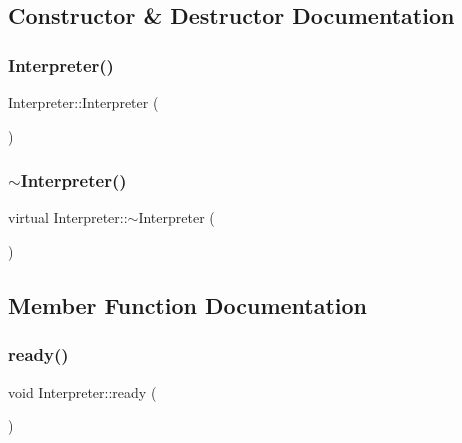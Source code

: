\subsection{Constructor \& Destructor Documentation}
\mbox{\label{classInterpreter_a9faf0dca72cd27223e5c447b580de2a5}} 
\subsubsection{\texorpdfstring{Interpreter()}{Interpreter()}}
{\footnotesize\ttfamily Interpreter\+::\+Interpreter (\begin{DoxyParamCaption}{ }\end{DoxyParamCaption})}

\mbox{\label{classInterpreter_a462a2467300903e0188ac6e4a6a612f6}} 
\subsubsection{\texorpdfstring{$\sim$\+Interpreter()}{~Interpreter()}}
{\footnotesize\ttfamily virtual Interpreter\+::$\sim$\+Interpreter (\begin{DoxyParamCaption}{ }\end{DoxyParamCaption})\hspace{0.3cm}{\ttfamily [virtual]}}



\subsection{Member Function Documentation}
\mbox{\label{classInterpreter_ab51bbc767ecf73aca9137b1a78406e20}} 
\subsubsection{\texorpdfstring{ready()}{ready()}}
{\footnotesize\ttfamily void Interpreter\+::ready (\begin{DoxyParamCaption}{ }\end{DoxyParamCaption})}

